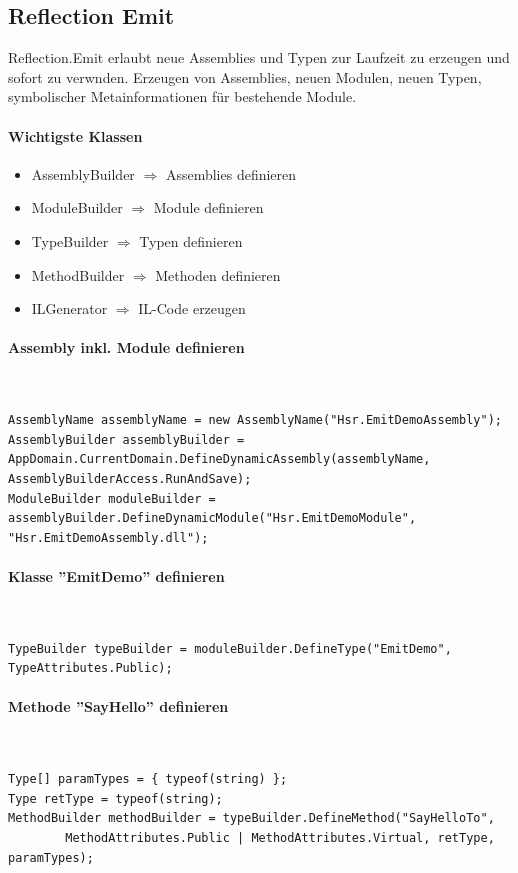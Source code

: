 \documentclass[
a4paper,
oneside,
10pt,
fleqn,
headsepline,
toc=listofnumbered, 
bibliography=totocnumbered]{scrartcl}
\begin{document}
\subsection{Reflection Emit}
Reflection.Emit erlaubt neue Assemblies und Typen zur Laufzeit zu erzeugen und sofort zu verwnden. Erzeugen von Assemblies, neuen Modulen, neuen Typen, symbolischer Metainformationen für bestehende Module.
\paragraph{Wichtigste Klassen}
\begin{itemize}
	\item AssemblyBuilder $\Rightarrow$ Assemblies definieren
	\item ModuleBuilder $\Rightarrow$ Module definieren
	\item TypeBuilder $\Rightarrow$ Typen definieren
	\item MethodBuilder $\Rightarrow$ Methoden definieren
	\item ILGenerator $\Rightarrow$ IL-Code erzeugen
\end{itemize}

\paragraph{Assembly inkl. Module definieren}\mbox{} \\
\begin{lstlisting}
AssemblyName assemblyName = new AssemblyName("Hsr.EmitDemoAssembly");
AssemblyBuilder assemblyBuilder = AppDomain.CurrentDomain.DefineDynamicAssembly(assemblyName, AssemblyBuilderAccess.RunAndSave);
ModuleBuilder moduleBuilder = assemblyBuilder.DefineDynamicModule("Hsr.EmitDemoModule", "Hsr.EmitDemoAssembly.dll");
\end{lstlisting}

\paragraph{Klasse ''EmitDemo'' definieren}\mbox{} \\
\begin{lstlisting}
TypeBuilder typeBuilder = moduleBuilder.DefineType("EmitDemo", TypeAttributes.Public);
\end{lstlisting}

\paragraph{Methode ''SayHello'' definieren}\mbox{} \\
\begin{lstlisting}
Type[] paramTypes = { typeof(string) };
Type retType = typeof(string);
MethodBuilder methodBuilder = typeBuilder.DefineMethod("SayHelloTo",
        MethodAttributes.Public | MethodAttributes.Virtual, retType, paramTypes);
\end{lstlisting}
\end{document}
